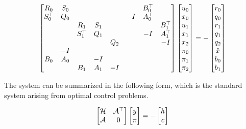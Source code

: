 \[
\begin{bmatrix}
    R_0   & S_0 &       &     &     &       & B_0^\top &       \\
    S_0^\top & Q_0 &       &     &     & -I    & A_0^\top &       \\
          &     & R_1   & S_1 &     &       &       & B_1^\top \\
          &     & S_1^\top & Q_1 &     &       & -I    & A_1^\top \\
          &     &       &     & Q_2 &       &       & -I    \\
          & -I  &       &     &     &       &       &       \\
    B_0   & A_0 &       & -I  &     &       &       &       \\
          &     & B_1   & A_1 & -I  &       &       &       \\
\end{bmatrix}
\begin{bmatrix}
        u_0 \\ x_0 \\ u_1 \\ x_1 \\ x_2 \\ \pi_0 \\ \pi_1 \\ \pi_2
\end{bmatrix}
= 
-\begin{bmatrix}
    r_0 \\ q_0 \\ r_1 \\ q_1 \\ q_2 \\ \hat{x} \\ b_0 \\ b_1
\end{bmatrix}
\]

The system can be summarized in the following form, which is the standard system arising from optimal control problems.

\[
\begin{bmatrix} \mathcal{H}  & \mathcal{A} ^\top \\ \mathcal{A}  & 0 \end{bmatrix} \begin{bmatrix} y \\ \pi \end{bmatrix} = -\begin{bmatrix} h \\ c \end{bmatrix}
\]

